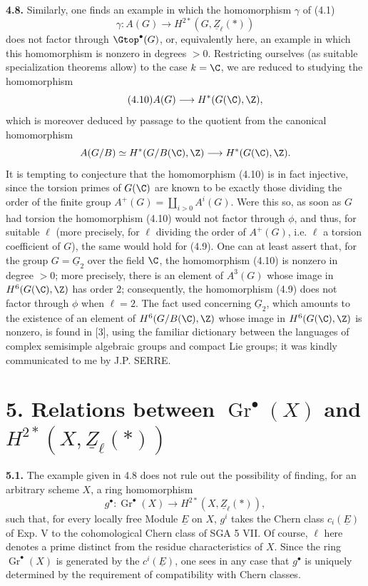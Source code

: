 \textbf{4.8.} Similarly, one finds an example in which the homomorphism $\gamma$ of (4.1)
\begin{equation}\tag{4.9}
 \gamma:A(G)\longrightarrow H^{2*}(G,\underline{Z}_\ell(*))
\end{equation}
does not factor through $\Gtop^\bullet(G)$, or, equivalently here, an example in which this homomorphism is nonzero in degrees $>0$. Restricting ourselves (as suitable specialization theorems allow) to the case $k=\C$, we are reduced to studying the homomorphism
\begin{equation}\tag{4.10}
 A(G)\longrightarrow H^*(G(\C),\Z),
\end{equation}
which is moreover deduced by passage to the quotient from the canonical homomorphism
\[
 A(G/B)\simeq H^*(G/B(\C),\Z)\longrightarrow H^*(G(\C),\Z).
\]
It is tempting to conjecture that the homomorphism (4.10) is in fact injective, since the torsion primes of $G(\C)$ are known to be exactly those dividing the order of the finite group $A^+(G)=\coprod_{i>0}A^i(G)$. Were this so, as soon as $G$ had torsion the homomorphism (4.10) would not factor through $\phi$, and thus, for suitable $\ell$ (more precisely, for $\ell$ dividing the order of $A^+(G)$, i.e. $\ell$ a torsion coefficient of $G$), the same would hold for (4.9). One can at least assert that, for the group $G=\underline{G}_2$ over the field $\C$, the homomorphism (4.10) is nonzero in degree $>0$; more precisely, there is an element of $A^3(G)$ whose image in $H^6(G(\C),\Z)$ has order $2$; consequently, the homomorphism (4.9) does not factor through $\phi$ when $\ell=2$. The fact used concerning $\underline{G}_2$, which amounts to the existence of an element of $H^6(G/B(\C),\Z)$ whose image in $H^6(G(\C),\Z)$ is nonzero, is found in [3], using the familiar dictionary between the languages of complex semisimple algebraic groups and compact Lie groups; it was kindly communicated to me by J.P. SERRE.

%
\section*{5. Relations between \(\operatorname{Gr}^\bullet(X)\) and \(H^{2*}(X,\underline{Z}_\ell(*))\)}

\textbf{5.1.} The example given in 4.8 does not rule out the possibility of finding, for an arbitrary scheme $X$, a ring homomorphism
\[
 g^\bullet:\operatorname{Gr}^\bullet(X)\longrightarrow H^{2*}(X,\underline{Z}_\ell(*)),
\]
such that, for every locally free Module $\underline{E}$ on $X$, $g^i$ takes the Chern class $c_i(\underline{E})$ of Exp. V to the cohomological Chern class of SGA 5 VII. Of course, $\ell$ here denotes a prime distinct from the residue characteristics of $X$. Since the ring $\operatorname{Gr}^\bullet(X)$ is generated by the $c^i(\underline{E})$, one sees in any case that $g^\bullet$ is uniquely determined by the requirement of compatibility with Chern classes.

